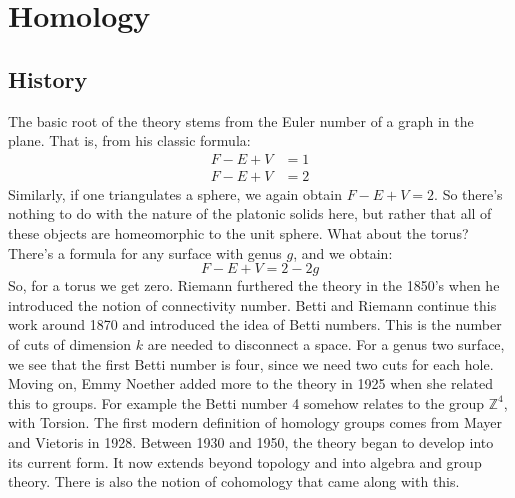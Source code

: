 \documentclass[crop=false,class=book,oneside]{standalone}
\begin{document}
    \section{Homology}
        \subsection{History}
            The basic root of the theory stems from the
            Euler number of a graph in the plane. That is,
            from his classic formula:
            \begin{align}
                F-E+V&=1
                \tag{Planar Graphs}\\
                F-E+V&=2
                \tag{Platonic Solids}
            \end{align}
            Similarly, if one triangulates a sphere, we again
            obtain $F-E+V=2$. So there's nothing to do with the
            nature of the platonic solids here, but rather that
            all of these objects are homeomorphic to the
            unit sphere. What about the torus? There's a formula
            for any surface with genus $g$, and we obtain:
            \begin{equation}
                F-E+V=2-2g
            \end{equation}
            So, for a torus we get zero. Riemann furthered the
            theory in the 1850's when he introduced the notion of
            connectivity number. Betti and Riemann continue this
            work around 1870 and introduced the idea of Betti
            numbers. This is the number of cuts of dimension $k$
            are needed to disconnect a space. For a genus
            two surface, we see that the first Betti number is
            four, since we need two cuts for each hole. Moving on,
            Emmy Noether added more to the theory in 1925
            when she related this to groups. For example the
            Betti number 4 somehow relates to the group
            $\mathbb{Z}^{4}$, with Torsion. The first modern
            definition of homology groups comes from Mayer and
            Vietoris in 1928. Between 1930 and 1950, the theory
            began to develop into its current form. It now extends
            beyond topology and into algebra and group theory.
            There is also the notion of cohomology that came along
            with this.
\end{document}
